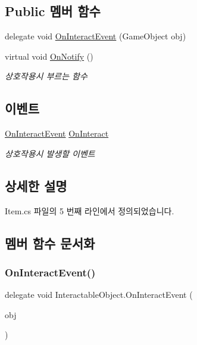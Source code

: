 \subsection*{Public 멤버 함수}
\begin{DoxyCompactItemize}
\item 
delegate void \mbox{\hyperlink{class_interactable_object_a70a579e4b09d53e6cb77b5222189d5eb}{On\+Interact\+Event}} (Game\+Object obj)
\item 
virtual void \mbox{\hyperlink{class_interactable_object_aa5c752d17471fe0daf58a4d00c218a29}{On\+Notify}} ()
\begin{DoxyCompactList}\small\item\em 상호작용시 부르는 함수 \end{DoxyCompactList}\end{DoxyCompactItemize}
\subsection*{이벤트}
\begin{DoxyCompactItemize}
\item 
\mbox{\hyperlink{class_interactable_object_a70a579e4b09d53e6cb77b5222189d5eb}{On\+Interact\+Event}} \mbox{\hyperlink{class_interactable_object_afe5e0b16d86c2ed4abf4a71a1995f7ae}{On\+Interact}}
\begin{DoxyCompactList}\small\item\em 상호작용시 발생할 이벤트 \end{DoxyCompactList}\end{DoxyCompactItemize}


\subsection{상세한 설명}


Item.\+cs 파일의 5 번째 라인에서 정의되었습니다.



\subsection{멤버 함수 문서화}
\mbox{\label{class_interactable_object_a70a579e4b09d53e6cb77b5222189d5eb}} 
\subsubsection{\texorpdfstring{OnInteractEvent()}{OnInteractEvent()}}
{\footnotesize\ttfamily delegate void Interactable\+Object.\+On\+Interact\+Event (\begin{DoxyParamCaption}\item[{Game\+Object}]{obj }\end{DoxyParamCaption})\hspace{0.3cm}{\ttfamily [inherited]}}

